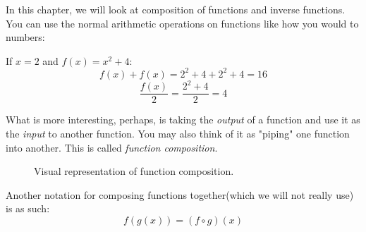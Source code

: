 \quad \quad In this chapter, we will look at composition of functions and inverse functions. You can use the normal arithmetic operations on functions like how you would to numbers:

\begin{example}
  If \(x=2\) and \(f(x)=x^2+4\):
  \begin{equation*}
    f(x)+f(x) = 2^2+4+2^2+4=16 
  \end{equation*}
  \begin{equation*}
    \frac{f(x)}{2} = \frac{2^2+4}{2} = 4 
  \end{equation*}
\end{example}

What is more interesting, perhaps, is taking the \textit{output} of a function and use it as the \textit{input} to another function. You may also think of it as "piping" one function into another. This is called \textit{function composition}.


  \begin{figure}[h]
  \centering


  \caption{Visual representation of function composition.}
\end{figure} 

Another notation for composing functions together(which we will not really use) is as such:
\begin{equation*}
  f(g(x))=(f \circ g)(x) 
\end{equation*}


